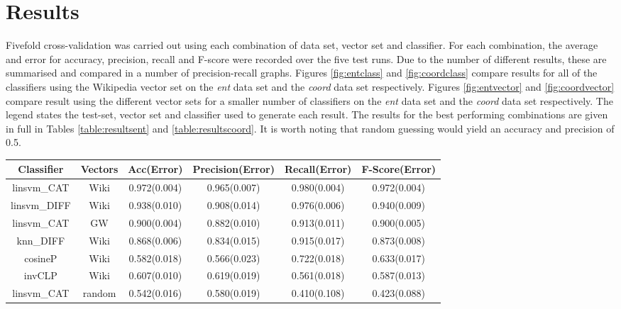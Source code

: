 \documentclass[11pt]{article}
\begin{document}
\section{Results}
\label{sect:results}
Fivefold cross-validation was carried out using each combination of data set, vector set and classifier.  For each combination, the average and error for accuracy, precision, recall and F-score were recorded over the five test runs.  Due to the number of different results, these are summarised and compared in a number of precision-recall graphs.  Figures \ref{fig:entclass}  and \ref{fig:coordclass} compare results for all of the classifiers using the Wikipedia vector set on the \emph{ent} data set and the \emph{coord} data set respectively.  Figures \ref{fig:entvector} and \ref{fig:coordvector} compare result using the different vector sets for a smaller number of classifiers on the \emph{ent} data set and the \emph{coord} data set respectively.  The legend states the test-set, vector set and classifier used to generate each result.   The results for the best performing combinations are given in full in Tables \ref{table:resultsent} and \ref{table:resultscoord}.  It is worth noting that random guessing would yield an accuracy and precision of 0.5.

\begin{table*}[ht]
\centering
\begin{tabular}{|c|c|c|c|c|c|}
\hline
Classifier&Vectors&Acc(Error)&Precision(Error)&Recall(Error)&F-Score(Error)\\
\hline
linsvm\_CAT&Wiki&0.972(0.004)&0.965(0.007)&0.980(0.004)&0.972(0.004)\\
linsvm\_DIFF&Wiki&0.938(0.010)&0.908(0.014)&0.976(0.006)&0.940(0.009)\\
linsvm\_CAT&GW&0.900(0.004)&0.882(0.010)&0.913(0.011)&0.900(0.005)\\
knn\_DIFF&Wiki&0.868(0.006)&0.834(0.015)&0.915(0.017)&0.873(0.008)\\
\hline
cosineP&Wiki&0.582(0.018)&0.566(0.023)&0.722(0.018)&0.633(0.017)\\
invCLP&Wiki&0.607(0.010)&0.619(0.019)&0.561(0.018)&0.587(0.013)\\
linsvm\_CAT&random&0.542(0.016)&0.580(0.019)&0.410(0.108)&0.423(0.088)\\
\hline
\end{tabular}
\caption{Key results for the \emph{ent} data set}
\label{table:resultsent}
\end{table*}
\end{document}

